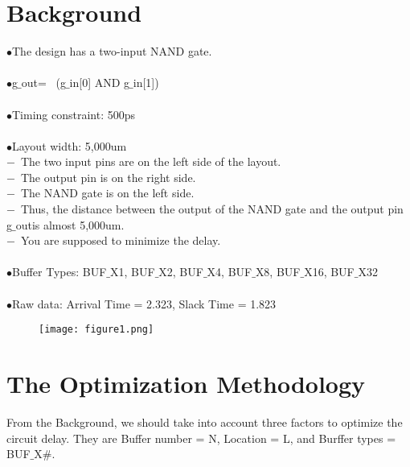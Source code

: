 \documentclass[a4paper,11pt]{article}
\begin{document}
\begin{flushleft}
\section*{Background}
$\bullet$\quad The design has a two-input NAND gate.\\
\hspace*{\fill} \\
$\bullet$\quad g$\_$out= ~(g$\_$in[0] AND g$\_$in[1])\\
\hspace*{\fill} \\
$\bullet$\quad Timing constraint: 500ps\\
\hspace*{\fill} \\
$\bullet$\quad Layout width: 5,000um\\
\hspace*{0.7cm}$-$\ The two input pins are on the left side of the layout.\\
\hspace*{0.7cm}$-$\ The output pin is on the right side.\\
\hspace*{0.7cm}$-$\ The NAND gate is on the left side.\\
\hspace*{0.7cm}$-$\ Thus, the distance between the output of the NAND gate and the output pin g$\_$outis \hspace*{1.1cm}almost 5,000um.\\
\hspace*{0.7cm}$-$\ You are supposed to minimize the delay.\\
\hspace*{\fill} \\
$\bullet$\quad Buffer Types: BUF$\_$X1, BUF$\_$X2, BUF$\_$X4, BUF$\_$X8, BUF$\_$X16, BUF$\_$X32\\
\hspace*{\fill} \\
$\bullet$\quad Raw data: Arrival Time = 2.323, Slack Time = 1.823\\

\begin{figure}[ht]
\texttt{[image: figure1.png]}
\end{figure}

\newpage
\section*{The Optimization Methodology}
From the Background, we should take into account three factors to optimize the circuit delay. They are Buffer number = N, Location = L, and Burffer types = BUF$\_$X$\#$.\\

\end{flushleft}
\end{document}
